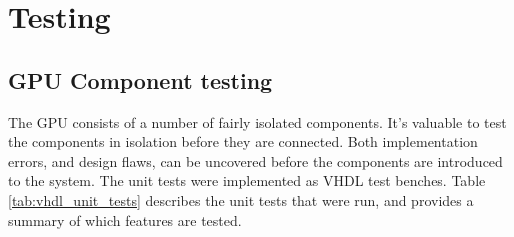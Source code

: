 \documentclass[../main/report.tex]{subfiles}
\begin{document}
\chapter{Testing}

\section{GPU Component testing}
The GPU consists of a number of fairly isolated components.
It's valuable to test the components in isolation before they are connected.
Both implementation errors, and design flaws, can be uncovered before the components are introduced to the system.
The unit tests were implemented as VHDL test benches.
Table \ref{tab:vhdl_unit_tests} describes the unit tests that were run, and provides a summary of which features are tested.
\end{document}
